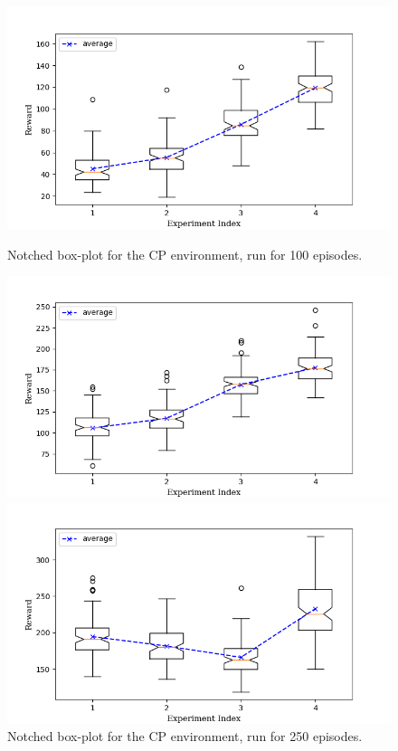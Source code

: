 \documentclass[hidelinks,journal]{IEEEtran}
\begin{document}
\begin{figure}[p]
  \centering
  \includegraphics[scale=0.45]{graph/cp1ResBox.png}
  \caption{Notched box-plot for the CP environment, run for 100 episodes.}
  \label{fig:cp1ResBox}
  \includegraphics[scale=0.45]{graph/cp2ResBox.png}
  \caption{Notched box-plot for the CP environment, run for 250 episodes.}
  \label{fig:cp2ResBox}
  \includegraphics[scale=0.45]{graph/cp3ResBox.png}

\end{figure}
\end{document}
